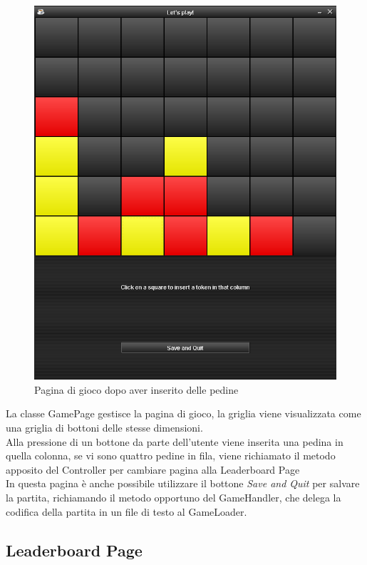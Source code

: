 \begin{figure}
    \centering
    \includegraphics[scale=0.5]{img/game-page2}
    \caption{Pagina di gioco dopo aver inserito delle pedine}
    \label{fig:game-page2}
\end{figure}

La classe GamePage gestisce la pagina di gioco, la griglia viene visualizzata come una griglia di bottoni delle
stesse dimensioni. \\
Alla pressione di un bottone da parte dell'utente viene inserita una pedina in quella colonna, se vi sono quattro
pedine in fila, viene richiamato il metodo apposito del Controller per cambiare pagina alla Leaderboard Page \\
In questa pagina è anche possibile utilizzare il bottone \textit{Save and Quit} per salvare la partita, richiamando
il metodo opportuno del GameHandler, che delega la codifica della partita in un file di testo al GameLoader. \\

\newpage
\subsection{Leaderboard Page}\label{subsec:leaderboard-page}


